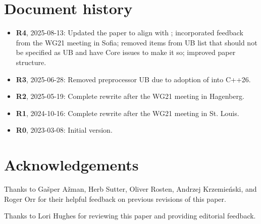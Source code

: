 \section*{Document history}
\begin{itemize}
\item \textbf{R4}, 2025-08-13: Updated the paper to align with \cite{P3745R0}; incorporated feedback from the WG21 meeting in Sofia; removed items from UB list that should not be specified as UB and have Core issues to make it so; improved paper structure.
\item \textbf{R3}, 2025-06-28: Removed preprocessor UB due to adoption of \cite{P2843R3} into C++26.
\item \textbf{R2}, 2025-05-19: Complete rewrite after the WG21 meeting in Hagenberg.
\item \textbf{R1}, 2024-10-16: Complete rewrite after the WG21 meeting in St. Louis.
\item \textbf{R0}, 2023-03-08: Initial version.
\end{itemize}

\section*{Acknowledgements}

Thanks to Ga\v{s}per A\v{z}man, Herb Sutter, Oliver Rosten, Andrzej Krzemie{\'n}ski, and Roger Orr for their helpful feedback on previous revisions of this paper.

Thanks to Lori Hughes for reviewing this paper and providing editorial feedback. 


\renewcommand{\addcontentsline}[3]{}%







